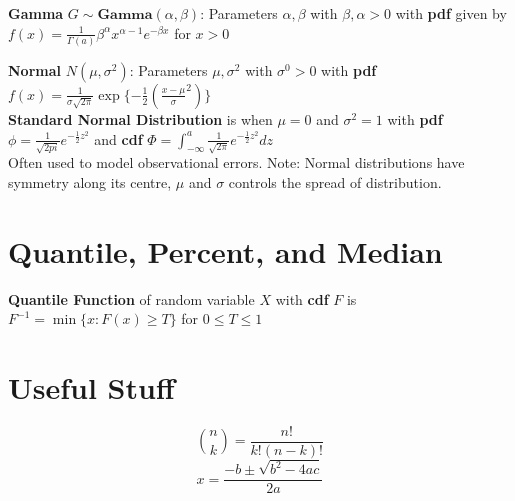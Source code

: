 \documentclass[5pt]{article}
\begin{document}
\begin{definition}
\textbf{Gamma} $G \sim \textbf{Gamma}(\alpha, \beta)$: Parameters $\alpha, \beta$ with $\beta, \alpha > 0$ with \textbf{pdf} given by $f(x)=\frac{1}{\Gamma(a)}\beta^\alpha x^{\alpha - 1} e^{-\beta x}$ for $x>0$\\
\end{definition}

\begin{definition}
\textbf{Normal} $N(\mu, \sigma^2)$: Parameters $\mu, \sigma^2$ with $\sigma^0 > 0$ with \textbf{pdf} $f(x)=\frac{1}{\sigma\sqrt{2\pi}}\exp{\{-\frac{1}{2}(\frac{x-\mu}{\sigma}^2)\}}$\\
\textbf{Standard Normal Distribution} is when $\mu = 0$ and $\sigma^2 = 1$ with \textbf{pdf} $\phi = \frac{1}{\sqrt{2pi}}e^{-\frac{1}{2}z^2}$ and \textbf{cdf} $\Phi = \int^a_{-\infty}\frac{1}{\sqrt{2\pi}}e^{-\frac{1}{2}z^2}dz$\\
Often used to model observational errors. Note: Normal distributions have symmetry along its centre, $\mu$ and $\sigma$ controls the spread of distribution.
\end{definition}

\section{Quantile, Percent, and Median}
\begin{definition}
\textbf{Quantile Function} of random variable $X$ with \textbf{cdf} $F$ is $F^{-1}=\min{\{x: F(x) \geq T\}}$ for $0\leq T \leq 1$
\end{definition}
\section{Useful Stuff}
\begin{equation}
{n \choose k} = \frac{n!}{k!(n-k)!}
\end{equation}
\begin{equation}
x=\frac{-b\pm\sqrt{b^2-4ac}}{2a}
\end{equation}
\end{document}
